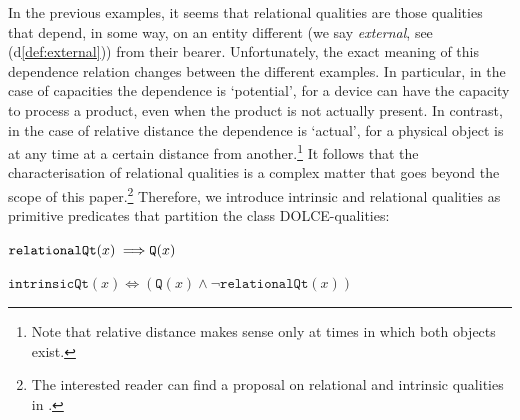 \documentclass[sw]{iosart2x}
\newcommand{\bflist}{\begin{list}{}{\setlength{\topsep}{2mm}\setlength{\partopsep}{0mm}\setlength{\parsep}{0mm}\setlength{\leftmargin}{9mm}\setlength{\labelwidth}{8mm}}}
\newcommand{\eflist}{\end{list}}
\newcommand{\AxLabel}{\textrm{a}}
\newcommand{\DefLabel}{\textrm{d}}
\newcounter{cntax}
\newcommand{\myax}[1]{\refstepcounter{cntax}\begin{small}{\bf \AxLabel\thecntax\label{ax:#1}}\end{small}}
\newcounter{cntdef}
\newcommand{\mydf}[1]{\refstepcounter{cntdef}\begin{small}{\bf \DefLabel\thecntdef\label{def:#1}}\end{small}}
\newcommand{\mytext}[1]{``#1''}
\newcommand{\refdf}[1]{({\DefLabel}\ref{#1})}
\newcommand{\generalStyle}[1]{\texttt{#1}}
\newcommand{\uniRel}[2]{\generalStyle{#1}(#2)}
\newcommand{\myiff}{\Longleftrightarrow}
\newcommand{\myfi}{\hspace{0.9mm} \Longrightarrow}
\newcommand{\DOLCE}{\textsc{DOLCE}\xspace} %
\newcommand{\DOLCEQuality}[1]{\uniRel{Q}{#1}}
\newcommand{\RelationalQuality}[1]{\uniRel{relationalQt}{#1}}
\newcommand{\IntrinsicQuality}[1]{\uniRel{intrinsicQt}{#1}}
\newcommand{\firstTimeKeyWord}[1]{\textit{#1}}
\begin{document}
In the previous examples, it seems that relational qualities are those qualities that depend, in some way, on an entity different (we say \firstTimeKeyWord{external}, see \refdf{def:external}) from their bearer. Unfortunately, the exact meaning of this dependence relation changes between the different examples. In particular, in the case of capacities the dependence is `potential', for a device can have the capacity to process a product, even when the product is not actually present. In contrast, in the case of relative distance the dependence is `actual', for a physical object is at any time at a certain distance from another.\footnote{Note that relative distance makes sense only at times in which both objects exist.}
It follows that the characterisation of relational qualities is a complex matter that goes beyond the scope of this paper.\footnote{The interested reader can find a proposal on relational and intrinsic qualities in \cite{fonsecaRelationsOntologyDrivenConceptual2019}.} Therefore, we introduce intrinsic and relational qualities as primitive predicates that partition the class \DOLCE-qualities: 
\bflist
  \item[\myax{relationalQtPartialDef}] $ \RelationalQuality{x} \myfi \DOLCEQuality{x} $ 
  \item[\mydf{intrinsicQtPartialDef}] $ \IntrinsicQuality{x} \myiff  ( \DOLCEQuality{x} \land \neg  \RelationalQuality{x})$
\eflist
\end{document}
